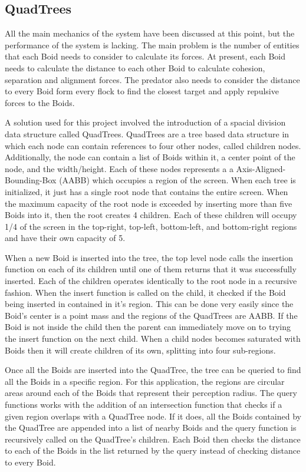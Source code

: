 \documentclass{egpubl}
\begin{document}
\subsection{QuadTrees}
\label{qtree}
All the main mechanics of the system have been discussed at this point, but the performance of the system is lacking. The main problem is the number of entities that each Boid needs to consider to calculate its forces.  At present, each Boid needs to calculate the distance to each other Boid to calculate cohesion, separation and alignment forces. The predator also needs to consider the distance to every Boid form every flock to find the closest target and apply repulsive forces to the Boids.
\par
A solution used for this project involved the introduction of a spacial division data structure called QuadTrees. QuadTrees are a tree based data structure in which each node can contain references to four other nodes, called children nodes. Additionally, the node can contain a list of Boids within it, a center point of the node, and the width/height. Each of these nodes represents a a Axis-Aligned-Bounding-Box (AABB) which occupies a region of the screen. When each tree is initialized, it just has a single root node that contains the entire screen. When the maximum capacity of the root node is exceeded by inserting more than five Boids into it, then the root creates 4 children. Each of these children will occupy 1/4 of the screen in the top-right, top-left, bottom-left, and bottom-right regions and have their own capacity of 5.
\par
When a new Boid is inserted into the tree, the top level node calls the insertion function on each of its children until one of them returns that it was successfully inserted. Each of the children operates identically to the root node in a recursive fashion. When the insert function is called on the child, it checked if the Boid being inserted in contained in it's region. This can be done very easily since the Boid's center is a point mass and the regions of the QuadTrees are AABB. If the Boid is not inside the child then the parent can immediately move on to trying the insert function on the next child. When a child nodes becomes saturated with Boids then it will create children of its own, splitting into four sub-regions.
\par
Once all the Boids are inserted into the QuadTree, the tree can be queried to find all the Boids in a specific region. For this application, the regions are circular areas around each of the Boids that represent their perception radius. The query functions works with the addition of an intersection function that checks if a given region overlaps with a QuadTree node. If it does, all the Boids contained by the QuadTree are appended into a list of nearby Boids and the query function is recursively called on the QuadTree's children. Each Boid then checks the distance to each of the Boids in the list returned by the query instead of checking distance to every Boid.
\end{document}
